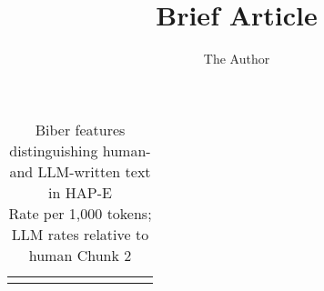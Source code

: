 \begin{table}[!t]
\caption*{
{\large Biber features distinguishing human- and LLM-written text in HAP-E} \\ 
{\small Rate per 1,000 tokens; LLM rates relative to human Chunk 2}
} 
\fontsize{12.0pt}{14.4pt}\selectfont
\begin{tabular*}{\linewidth}{@{\extracolsep{\fill}}lrrrrrrrrr}\documentclass[11pt, oneside]{article}   	%
\usepackage{geometry}                		%
\geometry{letterpaper}                   		%
\usepackage{graphicx}				%
\usepackage{amssymb}




\title{Brief Article}
\author{The Author}


\maketitle




\end{tabular*}
\end{table}
